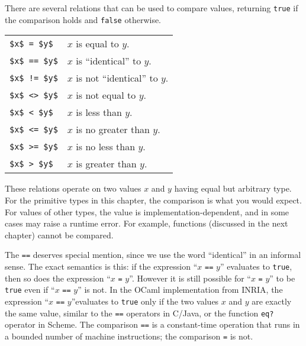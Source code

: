 There are several relations that can be used to compare values,
returning \hbox{\lstinline/true/} if the comparison holds and \hbox{\lstinline/false/}
otherwise.

\label{keyword:=}
\label{keyword:==}
\label{keyword:!=}
\label{keyword:<>}
\label{keyword:<}
\label{keyword:<=}
\label{keyword:>}
\label{keyword:>=}
\begin{center}
\begin{tabular}{ll}
\index{=@\lstinline$=$ comparison}
\hbox{\hbox{\lstinline/$x$ = $y$/}}  & $x$ is equal to $y$.\\
\index{==@\lstinline$==$ comparison}
\hbox{\hbox{\lstinline/$x$ == $y$/}} & $x$ is ``identical'' to $y$.\\
\index{!=@\lstinline$!=$ comparison}
\hbox{\hbox{\lstinline/$x$ != $y$/}} & $x$ is not ``identical'' to $y$.\\
\index{<>@\lstinline$<>$ comparison}
\hbox{\hbox{\lstinline/$x$ <> $y$/}} & $x$ is not equal to $y$.\\
\index{<@\lstinline$<$ comparison}
\hbox{\hbox{\lstinline/$x$ < $y$/}}  & $x$ is less than $y$.\\
\index{<=@\lstinline$<=$ comparison}
\hbox{\hbox{\lstinline/$x$ <= $y$/}} & $x$ is no greater than $y$.\\
\index{>=@\lstinline$>=$ comparison}
\hbox{\hbox{\lstinline/$x$ >= $y$/}} & $x$ is no less than $y$.\\
\index{>@\lstinline$>$ comparison}
\hbox{\hbox{\lstinline/$x$ > $y$/}}  & $x$ is greater than $y$.
\end{tabular}
\end{center}
%
These relations operate on two values $x$ and $y$ having equal but
arbitrary type.  For the primitive types in this chapter, the
comparison is what you would expect.  For values of other types, the
value is implementation-dependent, and in some cases may raise a
runtime error.  For example, functions (discussed in the next chapter)
cannot be compared.

The \hbox{\lstinline/==/} deserves special mention, since we use the
word ``identical'' in an informal sense.  The exact semantics is this:
if the expression ``$x$ \hbox{\lstinline/==/} $y$'' evaluates to
\hbox{\lstinline/true/}, then so does the expression ``$x$
\hbox{\lstinline/=/} $y$''.  However it is still possible for ``$x$
\hbox{\lstinline/=/} $y$'' to be \hbox{\lstinline/true/} even if ``$x$
\hbox{\lstinline/==/} $y$'' is not.  In the OCaml implementation from
INRIA, the expression ``$x$ \hbox{\lstinline/==/} $y$''evaluates to
\hbox{\lstinline/true/} only if the two values $x$ and $y$ are exactly
the same value, similar to the \hbox{\lstinline/==/} operators in
C/Java, or the function \hbox{\lstinline/eq?/} operator in Scheme.
The comparison \hbox{\lstinline/==/} is a constant-time operation that
runs in a bounded number of machine instructions; the comparison
\hbox{\lstinline/=/} is not.

